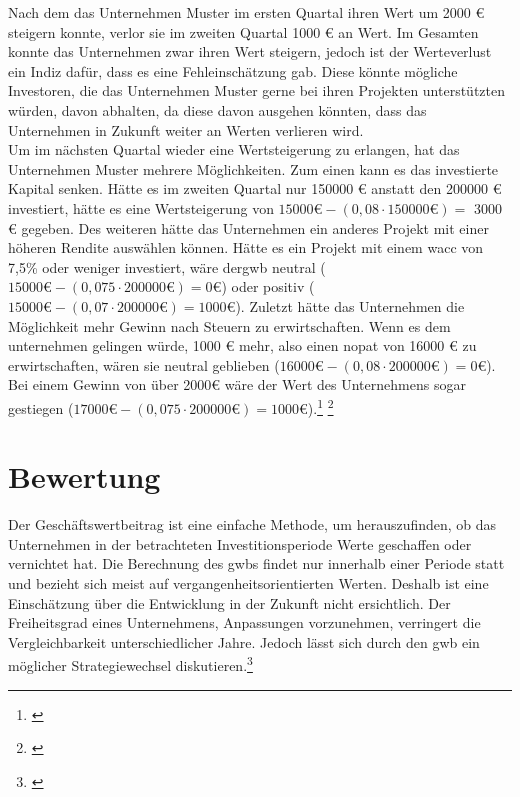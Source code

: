 Nach dem das Unternehmen Muster im ersten Quartal ihren Wert um 2000 € steigern konnte, verlor sie im zweiten Quartal 1000 € an Wert. Im Gesamten konnte das Unternehmen zwar ihren Wert steigern, jedoch ist der Werteverlust ein Indiz dafür, dass es eine Fehleinschätzung gab. Diese könnte mögliche Investoren, die das Unternehmen Muster gerne bei ihren Projekten unterstützten würden, davon abhalten, da diese davon ausgehen könnten, dass das Unternehmen in Zukunft weiter an Werten verlieren wird.\\
Um im nächsten Quartal wieder eine Wertsteigerung zu erlangen, hat das Unternehmen Muster mehrere Möglichkeiten. Zum einen kann es das investierte Kapital senken. Hätte es im zweiten Quartal nur 150000 € anstatt den 200000 € investiert, hätte es eine Wertsteigerung von $15000 \text{€} - (0,08 \cdot 150000 \text{€}) =$ 3000 € gegeben. Des weiteren hätte das Unternehmen ein anderes Projekt mit einer höheren Rendite auswählen können. Hätte es ein Projekt mit einem \ac{wacc} von 7,5\% oder weniger investiert, wäre der\ac{gwb} neutral ($15000 \text{€} - (0,075 \cdot 200000 \text{€}) = 0 \text{€}$) oder positiv ($15000 \text{€} - (0,07 \cdot 200000 \text{€}) = 1000 \text{€}$). Zuletzt hätte das Unternehmen die Möglichkeit mehr Gewinn nach Steuern zu erwirtschaften. Wenn es dem unternehmen gelingen würde, 1000 € mehr, also einen \ac{nopat} von 16000 € zu erwirtschaften, wären sie neutral geblieben ($16000 \text{€} - (0,08 \cdot 200000 \text{€}) = 0 \text{€}$). Bei einem Gewinn von über 2000€ wäre der Wert des Unternehmens sogar gestiegen ($17000 \text{€} - (0,075 \cdot 200000 \text{€}) = 1000 \text{€}$).\footnote{\cite{studyflix-eva}} \footnote{\cite{controlling-eva}}

\section{Bewertung}

Der Geschäftswertbeitrag ist eine einfache Methode, um herauszufinden, ob das Unternehmen in der betrachteten Investitionsperiode Werte geschaffen oder vernichtet hat. Die Berechnung des \ac{gwb}s findet nur innerhalb einer Periode statt und bezieht sich meist auf vergangenheitsorientierten Werten. Deshalb ist eine Einschätzung über die Entwicklung in der Zukunft nicht ersichtlich. Der Freiheitsgrad eines Unternehmens, Anpassungen vorzunehmen, verringert die Vergleichbarkeit unterschiedlicher Jahre. Jedoch lässt sich durch den \ac{gwb} ein möglicher Strategiewechsel diskutieren.\footnote{\cite{controlling-eva}}
